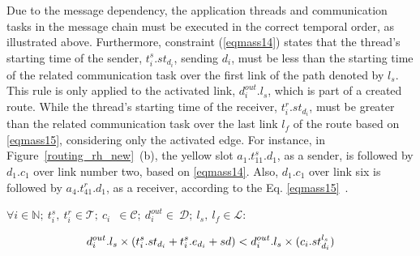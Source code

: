     
    
    
    Due to the message dependency, the application threads and communication tasks in the message chain must be executed in the correct temporal order, as illustrated above. Furthermore, constraint (\ref{eqmass14}) states that the thread's starting time of the sender, $t_i^{s}.st_{d_i}$, sending $d_i$, must be less than the starting time of the related communication task over the first link of the path denoted by $l_s$. This rule is only applied to the activated link, $d^{out}_i. l_{s}$, which is part of a created route. While the thread's starting time of the receiver, $t_i^{r}.st_{d_i}$, must be greater than the related communication task over the last link $l_f$ of the route based on \eqref{eqmass15}, considering only the activated edge. 
    For instance, in Figure~\ref{routing_rh_new}~(b), the yellow slot $a_1.t_{11}^{s}.d_1$, as a sender, is followed by $d_1.c_1$ over link number two, based on \eqref{eqmass14}. %
    Also, $d_1.c_1$ over link six is followed by $a_4.t_{41}^{r}.d_1$, as a receiver, according to the Eq. \eqref{eqmass15}~\cite{askaripoor2023designer}.\newline 

    $\forall i\in \mathbb{N};~t_i^{s},~t_i^{r}\in\mathcal{T};~{c_i}$~$\in\mathcal{C};~d_i^{out}\in~\mathcal{D};~l_s,~l_f\in\mathcal{L}$:\newline
    
    \begin{equation}
    	\begin{split}
    	d^{out}_i. l_{s} \times ({t_i^{s}}.{st}_{d_i} + {t_i^{s}}.e_{d_i} + sd) < d^{out}_i. l_{s} \times ({c_i}.{st}_{d_i}^{l_{s}})\raisetag{2\baselineskip}
    	\label{eqmass14}
    	\end{split}
    \end{equation}
    
